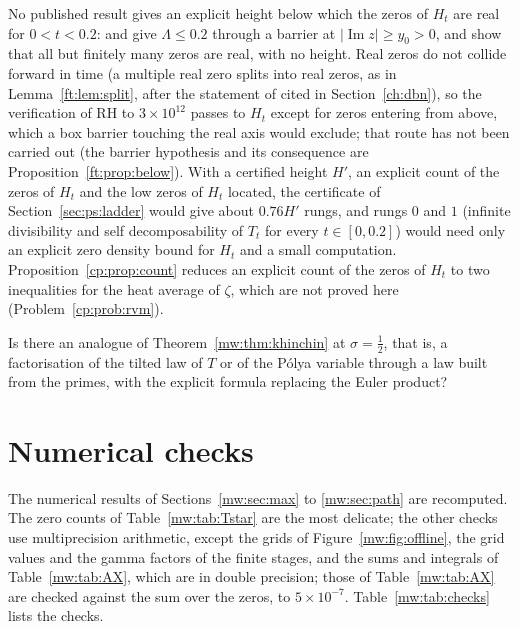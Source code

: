 \begin{remark}\label{mw:rem:flowcert}
No published result gives an explicit height below which the zeros of $H_t$ are real for $0<t<0.2$: \cite{Polymath} and \cite{PT21} give $\Lambda\leq0.2$ through a barrier at $|\operatorname{Im}z|\geq y_0>0$, and \cite{KKL09} show that all but finitely many zeros are real, with no height. Real zeros do not collide forward in time (a multiple real zero splits into real zeros, as in Lemma~\ref{ft:lem:split}, after the statement of \cite{deBruijn} cited in Section~\ref{ch:dbn}), so the verification of RH to $3\times10^{12}$ passes to $H_t$ except for zeros entering from above, which a box barrier touching the real axis would exclude; that route has not been carried out (the barrier hypothesis and its consequence are Proposition~\ref{ft:prop:below}). With a certified height $H'$, an explicit count of the zeros of $H_t$ and the low zeros of $H_t$ located, the certificate of Section~\ref{sec:ps:ladder} would give about $0.76H'$ rungs, and rungs $0$ and $1$ (infinite divisibility and self decomposability of $T_t$ for every $t\in[0,0.2]$) would need only an explicit zero density bound for $H_t$ and a small computation. Proposition~\ref{cp:prop:count} reduces an explicit count of the zeros of $H_t$ to two inequalities for the heat average of $\zeta$, which are not proved here (Problem~\ref{cp:prob:rvm}).
\end{remark}

\begin{problem}\label{mw:prob:khinchin}
Is there an analogue of Theorem~\ref{mw:thm:khinchin} at $\sigma=\tfrac12$, that is, a factorisation of the tilted law of $T$ or of the P\'olya variable through a law built from the primes, with the explicit formula replacing the Euler product?
\end{problem}

\section{Numerical checks}\label{mw:sec:checks}

The numerical results of Sections~\ref{mw:sec:max} to \ref{mw:sec:path} are recomputed. The zero counts of Table~\ref{mw:tab:Tstar} are the most delicate; the other checks use multiprecision arithmetic, except the grids of Figure~\ref{mw:fig:offline}, the grid values and the gamma factors of the finite stages, and the sums and integrals of Table~\ref{mw:tab:AX}, which are in double precision; those of Table~\ref{mw:tab:AX} are checked against the sum over the zeros, to $5\times10^{-7}$. Table~\ref{mw:tab:checks} lists the checks.


